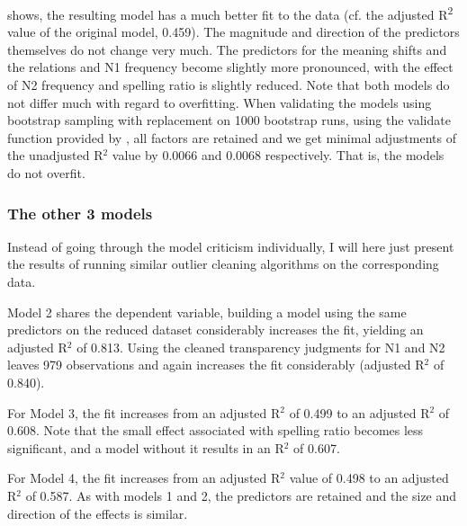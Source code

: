 shows, the
resulting model has a much better fit to the data (cf. the adjusted
R\textsuperscript{2} value of the original model, 0.459). The
magnitude and direction of the predictors themselves do not change very
much. The predictors for the meaning shifts and the relations and N1
frequency become slightly more pronounced, with the effect of N2
frequency and spelling ratio is slightly reduced.
Note that both
models do not differ much with regard to overfitting. 
When validating the models using bootstrap sampling with replacement on 1000
bootstrap runs, using the validate function provided by
\citet{rms:2016}, all factors are retained and we get minimal adjustments of the unadjusted R$^2$
value by  0.0066 and  0.0068 respectively. That is, the models do not overfit.

\subsubsection{The other 3 models}
\label{sec:the-other-three}

Instead of going through the model criticism individually, I will here
just present the results of running similar outlier cleaning
algorithms on the corresponding data. 

Model 2 shares the dependent variable, building a model using the same predictors on the
reduced dataset considerably increases the fit, yielding an adjusted R$^2$ of 0.813. %
Using the cleaned transparency judgments for N1 and N2 leaves 979 observations and again increases the fit considerably (adjusted R$^2$ of 0.840).

\enlargethispage{1\baselineskip}
For Model 3, the fit increases from an adjusted R$^2$ of 0.499 to
an adjusted R$^2$ of 0.608. Note that the small effect associated with spelling ratio
becomes less significant, and a model without it results in an R$^2$
of 0.607.

For Model 4, the fit increases from an adjusted R$^2$ value of 0.498 to an adjusted R$^2$ of 
0.587. As with models 1 and 2, the predictors are retained and the
size and direction of the effects is similar.




